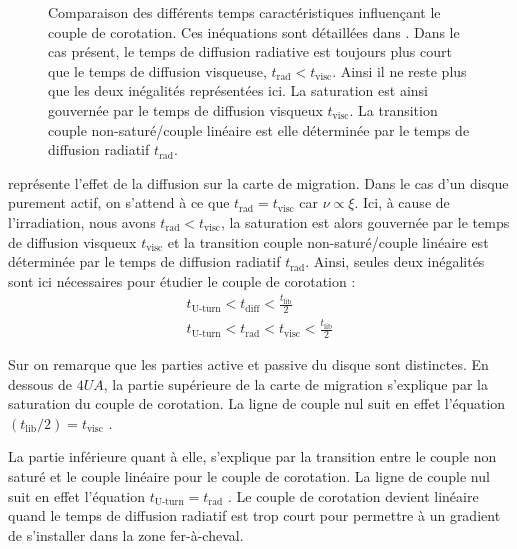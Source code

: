 \begin{figure}[htbp]
\centering
{}\hfill
{}

\caption[Cartes des temps de diffusions dans le disque.]{Comparaison des différents temps caractéristiques influençant le couple
de corotation. Ces inéquations sont détaillées
dans . Dans le cas présent, le temps de diffusion radiative est toujours plus court que le temps
de diffusion visqueuse, $t_\text{rad}<t_\text{visc}$. Ainsi il ne reste plus que les deux inégalités représentées
ici. La saturation est ainsi gouvernée par le temps de diffusion visqueux $t_\text{visc}$. La transition couple non-saturé/couple linéaire est elle déterminée par le temps de diffusion radiatif $t_\text{rad}$.}\label{fig:timescales_maps}
\end{figure}

 représente l'effet de la diffusion sur la carte de migration. Dans le cas d'un disque purement actif, on s'attend à ce que $t_\text{rad}=t_\text{visc}$ car $\nu\propto\xi$. Ici, à cause de l'irradiation, nous avons $t_\text{rad}<t_\text{visc}$, la saturation est alors gouvernée par le temps de diffusion visqueux $t_\text{visc}$ et la transition couple non-saturé/couple linéaire est déterminée par le temps de diffusion radiatif $t_\text{rad}$. Ainsi, seules deux inégalités sont ici nécessaires pour étudier le couple de corotation :
\begin{align}
t_\text{U-turn} < t_\text{diff} < \frac{t_\text{lib}}{2}\\\nonumber
t_\text{U-turn} < t_\text{rad} < t_\text{visc} < \frac{t_\text{lib}}{2}
\end{align}

Sur  on remarque que les parties active et passive du disque sont distinctes. En dessous de $4\unit{UA}$, la partie supérieure de la carte de migration s'explique par la saturation du couple de corotation. La ligne de couple nul suit en effet l'équation $(t_\text{lib}/2) = t_\text{visc}$ .

La partie inférieure quant à elle, s'explique par la transition entre le couple non saturé et le couple linéaire pour le couple de corotation. La ligne de couple nul suit en effet l'équation $t_\text{U-turn} = t_\text{rad}$ . Le couple de corotation devient linéaire quand le temps de diffusion radiatif est trop court pour permettre à un gradient de s'installer dans la zone fer-à-cheval.

